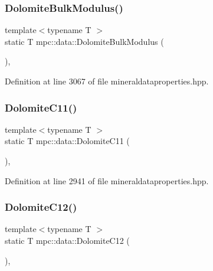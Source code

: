 \subsubsection{\texorpdfstring{Dolomite\+Bulk\+Modulus()}{DolomiteBulkModulus()}}
{\footnotesize\ttfamily template$<$typename T $>$ \\
static T mpc\+::data\+::\+Dolomite\+Bulk\+Modulus (\begin{DoxyParamCaption}{ }\end{DoxyParamCaption})\hspace{0.3cm}{\ttfamily [inline]}, {\ttfamily [static]}}



Definition at line 3067 of file mineraldataproperties.\+hpp.

\mbox{\label{namespacempc_1_1data_a99af38f08d4e63a29e45e6495c2af985}} 
\subsubsection{\texorpdfstring{Dolomite\+C11()}{DolomiteC11()}}
{\footnotesize\ttfamily template$<$typename T $>$ \\
static T mpc\+::data\+::\+Dolomite\+C11 (\begin{DoxyParamCaption}{ }\end{DoxyParamCaption})\hspace{0.3cm}{\ttfamily [inline]}, {\ttfamily [static]}}



Definition at line 2941 of file mineraldataproperties.\+hpp.

\mbox{\label{namespacempc_1_1data_acb49463f06f062c08d528fe7606db9ca}} 
\subsubsection{\texorpdfstring{Dolomite\+C12()}{DolomiteC12()}}
{\footnotesize\ttfamily template$<$typename T $>$ \\
static T mpc\+::data\+::\+Dolomite\+C12 (\begin{DoxyParamCaption}{ }\end{DoxyParamCaption})\hspace{0.3cm}{\ttfamily [inline]}, {\ttfamily [static]}}




